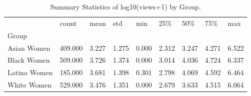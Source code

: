 \begin{table}[htbp]
\centering
\caption{Summary Statistics of log10(views+1) by Group.}
\label{tab:eda_views_stats}
\begin{tabular}{lllllllll}
\toprule
 & count & mean & std & min & 25\% & 50\% & 75\% & max \\
Group &  &  &  &  &  &  &  &  \\
\midrule
Asian Women & 409.000 & 3.227 & 1.275 & 0.000 & 2.312 & 3.247 & 4.271 & 6.522 \\
Black Women & 509.000 & 3.726 & 1.374 & 0.000 & 3.014 & 4.036 & 4.724 & 6.337 \\
Latina Women & 185.000 & 3.681 & 1.398 & 0.301 & 2.798 & 4.069 & 4.592 & 6.464 \\
White Women & 529.000 & 3.476 & 1.351 & 0.000 & 2.679 & 3.633 & 4.515 & 6.064 \\
\bottomrule
\end{tabular}

\end{table}